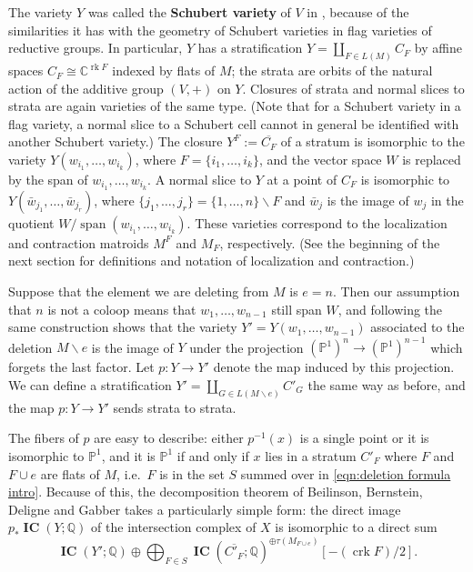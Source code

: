 \documentclass[12pt,reqno]{amsart}
\theoremstyle{definition}
\theoremstyle{remark}
\newcommand{\crk}{\operatorname{crk}}
\newcommand{\ssm}{\smallsetminus}
\newcommand{\rk}{\operatorname{rk}}
\newcommand{\C}{{\mathbb{C}}}
\newcommand{\Q}{{\mathbb{Q}}}
\newcommand{\IC}{\mathop{\mathbf{IC}}}
\renewcommand{\(}{\left(}
\renewcommand{\)}{\right)}
\newcommand{\<}{\left<}
\renewcommand{\>}{\right>}
\renewcommand{\setminus}{\smallsetminus}
\begin{document}
The variety $Y$ was called the \textbf{Schubert variety} of $V$ in \cite{PXY}, because of the similarities it has with the geometry of Schubert varieties in flag varieties of reductive groups. 
In particular, $Y$ has a stratification $Y = \coprod_{F \in L(M)} C_F$ 
by affine spaces $C_F \cong \C^{\rk F}$ indexed by flats of $M$; the strata are orbits of the natural action of the additive group $(V, +)$ on $Y$.   
Closures of strata and normal slices to strata are again varieties of the same type.  (Note that for a Schubert variety in a flag variety, a normal slice to a Schubert cell cannot in general be identified with another Schubert variety.) 
The closure $Y^F := \overline{C_F}$ of a stratum is isomorphic to the variety 
$Y(w_{i_1}, \dots, w_{i_k})$, where $F= \{i_1,\dots, i_k\}$, and the vector space $W$ is replaced by the span of $w_{i_1},\dots, w_{i_k}$.
A normal slice to $Y$ at a point of $C_F$ is isomorphic to $Y(\bar w_{j_1}, \dots, \bar w_{j_r})$, where $\{j_1,\dots, j_r\} = \{1,\dots, n\} \setminus F$ and $\bar w_j$ is the image of $w_j$ in the quotient $W/\operatorname{span}(w_{i_1}, \dots, w_{i_k})$.  These varieties correspond to the localization and contraction matroids $M^F$ and $M_F$, respectively.  (See the beginning of the next section for definitions and notation of localization and contraction.)

Suppose that the element we are deleting from $M$ is $e = n$.  Then our assumption that $n$ is not a coloop means that $w_1, \dots, w_{n-1}$ still span $W$, and following the same construction shows that the variety $Y' = Y(w_1,\dots, w_{n-1})$ associated to the deletion $M\ssm e$ is the image of $Y$ under the projection 
$(\mathbb P^1)^n \to (\mathbb P^1)^{n-1}$ which forgets the last factor.  Let $p\colon Y \to Y'$ denote the map induced by this projection.
We can define a stratification $Y' = \coprod_{G \in L(M\ssm e)} C'_{G}$ the same way as before, and the map $p\colon Y \to Y'$ sends strata to strata.

The fibers of $p$ are easy to describe: either
 $p^{-1}(x)$ is a single point or it is isomorphic to $\mathbb P^1$, and it is $\mathbb P^1$ if and only if $x$ lies in a  
stratum $C'_F$ where $F$ and $F\cup e$ are flats of $M$, i.e.\ $F$ is in the set $S$ summed over in \eqref{eqn:deletion formula intro}.
Because of this, the decomposition theorem of 
Beilinson, Bernstein, Deligne and Gabber takes a particularly simple form: the 
 direct image $p_*\IC(Y; \Q)$ of the intersection complex of $X$ 
 is isomorphic to a direct sum
\begin{equation}\label{eqn:semi-small decomposition} \IC(Y';\Q) \oplus \bigoplus_{F\in S} \IC(\overline{C'_F};\Q)^{\oplus \tau(M_{F\cup e})}[-(\crk F)/2] .
\end{equation}
 
\end{document}
